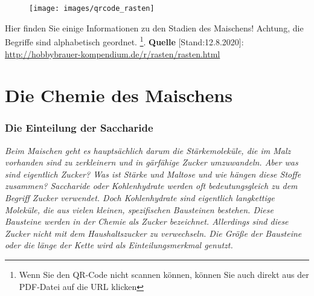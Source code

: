 \documentclass{scrartcl}  %
\begin{document}
\vspace{0.3cm}
			\begin{tcolorbox}[enhanced,
				colback=white,
				colframe=black,
				fonttitle=\sffamily\bfseries\large, 
				title=Informationen zu den Rasten,  %
				attach boxed title to top left={xshift=3.2mm,yshift=-0.50mm},
				boxed title style={skin=enhancedfirst jigsaw,size=small,arc=1mm,bottom=-1mm,colframe=black,height=0.75cm},
				colbacktitle=black,
				drop lifted shadow]
				\begin{figure}  
					\centering
					\vspace{-14pt}  %
					\texttt{[image: images/qrcode\_rasten]}
				\end{figure}
				
					Hier finden Sie einige Informationen zu den Stadien des Maischens! Achtung, die Begriffe sind alphabetisch geordnet. \footnote{Wenn Sie den QR-Code nicht scannen können, können Sie auch direkt aus der PDF-Datei auf die URL klicken}. \newline
					\textbf{Quelle} [Stand:12.8.2020]: \newline 
					\url{http://hobbybrauer-kompendium.de/r/rasten/rasten.html}
				\vspace{0.3cm}  %
			\end{tcolorbox}

\newpage
			
	\part{Die Chemie des Maischens}
	
	\section{Die Einteilung der Saccharide}
	
		\textit{Beim Maischen geht es hauptsächlich darum die Stärkemoleküle, die im Malz vorhanden sind zu zerkleinern und in gärfähige Zucker umzuwandeln. Aber was sind eigentlich Zucker? Was ist Stärke und Maltose und wie hängen diese Stoffe zusammen?
		Saccharide oder Kohlenhydrate werden oft bedeutungsgleich zu dem Begriff Zucker verwendet. Doch Kohlenhydrate sind eigentlich langkettige Moleküle, die aus vielen kleinen, spezifischen Bausteinen bestehen. Diese Bausteine werden in der Chemie als Zucker bezeichnet. Allerdings sind diese Zucker nicht mit dem Haushaltszucker zu verwechseln. Die Größe der Bausteine oder die länge der Kette wird als Einteilungsmerkmal genutzt.} \newline
		
\end{document}
